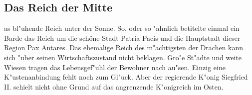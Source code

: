 \subsection{Das Reich der Mitte}
as bl"uhende Reich
unter der Sonne. So, oder so "ahnlich betitelte einmal ein Barde das
Reich um die schöne Stadt Patria Pacis und
die Hauptstadt dieser Region Pax Antares. Das
ehemalige Reich des m"achtigsten der Drachen kann sich "uber seinen
Wirtschaftszustand nicht beklagen. Gro"e St"adte und weite Wiesen
tragen das Lebensgef"uhl der Bewohner nach au"sen. Einzig eine
K"ustenanbindung fehlt noch zum Gl"uck. Aber der regierende K"onig Siegfried II.
schielt nicht ohne Grund auf das angrenzende K"onigreich im Osten.
